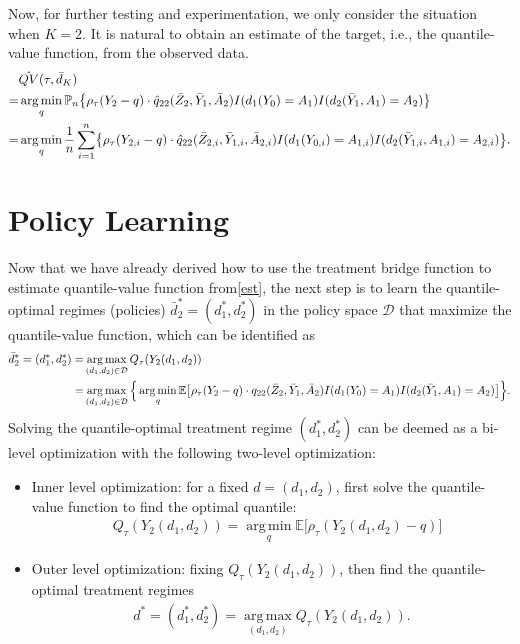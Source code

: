 \documentclass[10pt]{article}
\DeclareMathOperator*{\argmax}{arg\,max}
\DeclareMathOperator*{\argmin}{arg\,min}
\theoremstyle{remark} \newtheorem{rem}{Remark}
\begin{document}
Now, for further testing and experimentation, we only consider the situation when $K=2$.
It is natural to obtain an estimate of the target, i.e., the quantile-value function, from the observed data.
\begin{align}
    &\hat{QV}(\tau,\bar d_K) \notag \\
    =& \argmin_{q}  \mathbb{P}_n \bigl\{\rho_\tau(Y_{2}-q)\cdot \hat q_{22}(\bar Z_{2}, \bar Y_{1}, \bar A_{2}) I(d_1(Y_{0})=A_1)I(d_2(\bar Y_{1},A_1)=A_2) \bigr\} \notag \\
    =& \argmin_{q} \frac{1}{n}\sum_{i=1}^n  \bigl\{\rho_\tau(Y_{2,i} - q)\cdot \hat q_{22}(\bar Z_{2,i}, \bar Y_{1,i}, \bar A_{2,i}) I(d_1(Y_{0,i})=A_{1,i})I(d_2(\bar Y_{1,i},A_{1,i})=A_{2,i}) \bigr\}.
    \label{est}
\end{align}



\section{Policy Learning}
Now that we have already derived how to use the treatment bridge function to estimate quantile-value function from\eqref{est}, the next step is to learn the quantile-optimal regimes (policies) $\bar d_2^* = (d_1^*, d_2^*)$ in the policy space $\mathcal{D}$ that maximize the quantile-value function, which can be identified as
\begin{align}
    \bar d_2^* = (d_1^*, d_2^*) =&  \argmax_{(d_1,d_2) \in \mathcal{D}} Q_\tau(Y_2(d_1, d_2))    \notag\\
     =& \argmax_{(d_1,d_2) \in \mathcal{D}} \Big\{\argmin_{q}\mathbb{E} \bigl[\rho_\tau(Y_{2}-q)\cdot q_{22}(\bar Z_{2}, \bar Y_{1}, \bar A_{2}) I(d_1(Y_{0})=A_1)I(d_2(\bar Y_{1},A_1)=A_2) \bigr]\Big\}.  \label{ident}
\end{align}
Solving the quantile-optimal treatment regime $(d_1^*,d_2^*)$ can be deemed as a bi-level optimization with the following two-level optimization:
\begin{itemize}
    \item Inner level optimization: for a fixed $d=(d_1,d_2)$, first solve the quantile-value function to find the optimal quantile:
    \begin{align}
    & Q_\tau(Y_2(d_1,d_2)) = \argmin\limits_{q} \mathbb{E}\big[\rho_\tau(Y_{2}(d_1,d_2) - q) \big] \label{inner}
    \end{align}
    \item Outer level optimization: fixing $Q_\tau(Y_2(d_1,d_2))$, then find the quantile-optimal treatment regimes  
    \begin{align}
    d^* = (d_1^*,d_2^*) = \argmax \limits_{(d_1,d_2)} Q_\tau(Y_2(d_1,d_2)).
    \label{outer}
    \end{align}
\end{itemize}
\end{document}
